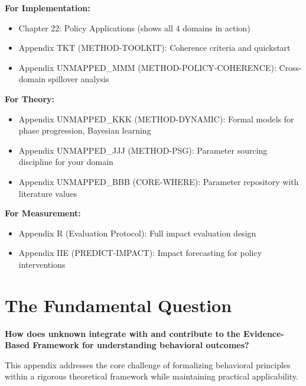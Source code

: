 \textbf{For Implementation:}
\begin{itemize}[nosep]
\item Chapter 22: Policy Applications (shows all 4 domains in action)
\item Appendix TKT (METHOD-TOOLKIT): Coherence criteria and quickstart
\item Appendix UNMAPPED_MMM (METHOD-POLICY-COHERENCE): Cross-domain spillover analysis
\end{itemize}

\textbf{For Theory:}
\begin{itemize}[nosep]
\item Appendix UNMAPPED_KKK (METHOD-DYNAMIC): Formal models for phase progression, Bayesian learning
\item Appendix UNMAPPED_JJJ (METHOD-PSG): Parameter sourcing discipline for your domain
\item Appendix UNMAPPED_BBB (CORE-WHERE): Parameter repository with literature values
\end{itemize}

\textbf{For Measurement:}
\begin{itemize}[nosep]
\item Appendix R (Evaluation Protocol): Full impact evaluation design
\item Appendix IIE (PREDICT-IMPACT): Impact forecasting for policy interventions
\end{itemize}



\section{The Fundamental Question}
\label{sec:lll-fundamental}

\begin{tcolorbox}[
    colback=red!5!white,
    colframe=red!75!black,
    title={\textbf{Fundamental Question}}
]
\textbf{How does unknown integrate with and contribute to the
Evidence-Based Framework for understanding behavioral outcomes?}

This appendix addresses the core challenge of formalizing behavioral principles
within a rigorous theoretical framework while maintaining practical applicability.
\end{tcolorbox}


